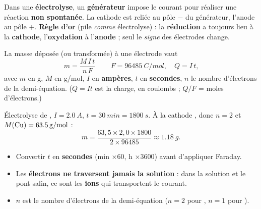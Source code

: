 \documentclass[11pt,a4paper]{article}
\begin{document}
\begin{cle}
Dans une \textbf{électrolyse}, un \textbf{générateur} impose le courant pour réaliser une réaction
\textbf{non spontanée}. La cathode est reliée au pôle $-$ du générateur, l'anode au pôle $+$.
\textbf{Règle d'or} (pile \emph{comme} électrolyse) : la \textbf{réduction} a toujours lieu à la
\textbf{cathode}, l'\textbf{oxydation} à l'\textbf{anode} ; seul le \emph{signe} des électrodes change.
\end{cle}

\begin{cle}
La masse déposée (ou transformée) à une électrode vaut
\[
\boxed{\,m=\dfrac{M\,I\,t}{n\,F}\,}\qquad F=\qty{96485}{C\per mol},\quad Q=I\,t,
\]
avec $m$ en g, $M$ en g/mol, $I$ en \textbf{ampères}, $t$ en \textbf{secondes}, $n$ le nombre
d'électrons de la demi-équation. ($Q=It$ est la charge, en coulombs ; $Q/F$ = moles d'électrons.)
\end{cle}

\begin{exemplebox}
Électrolyse de , $I=\qty{2.0}{A}$, $t=\qty{30}{min}=\qty{1800}{s}$. À la cathode
, donc $n=2$ et $M(\ce{Cu})=\qty{63.5}{g\per mol}$ :
\[
m=\frac{63{,}5\times 2{,}0\times 1800}{2\times 96485}\approx \qty{1.18}{g}.
\]
\end{exemplebox}

\begin{piege}
\begin{itemize}[leftmargin=1.5em,topsep=1pt,itemsep=0pt]
  \item Convertir $t$ en \textbf{secondes} (min $\times 60$, h $\times 3600$) avant d'appliquer Faraday.
  \item Les \textbf{électrons ne traversent jamais la solution} : dans la solution et le pont salin,
        ce sont les \textbf{ions} qui transportent le courant.
  \item $n$ est le nombre d'électrons de la demi-équation ($n=2$ pour , $n=1$ pour ).
\end{itemize}
\end{piege}
\end{document}
